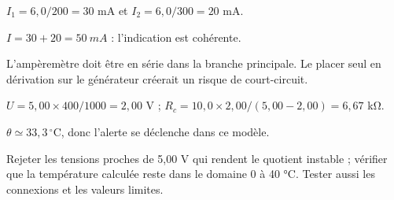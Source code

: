 \begin{questions}
\item $I_1=6,0/200=30$ mA et $I_2=6,0/300=20$ mA.
\item $I=30+20=\qty{50}{mA}$ : l’indication est cohérente.
\item L’ampèremètre doit être en série dans la branche principale. Le placer seul en dérivation sur le générateur créerait un risque de court-circuit.
\end{questions}

\begin{questions}
\item $U=5,00\times400/1000=2,00$ V ; $R_c=10,0\times2,00/(5,00-2,00)=6,67$ kΩ.
\item $\theta\simeq33,3\,^{\circ}\mathrm C$, donc l’alerte se déclenche dans ce modèle.
\item Rejeter les tensions proches de 5,00 V qui rendent le quotient instable ; vérifier que la température calculée reste dans le domaine 0 à 40 °C. Tester aussi les connexions et les valeurs limites.
\end{questions}


